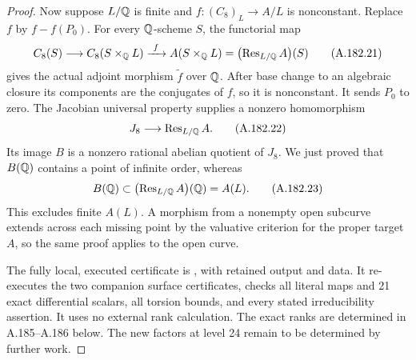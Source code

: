 \begin{proof}
Now suppose \(L/\mathbb Q\) is finite and \(f:(C_8)_L\to A/L\)
is nonconstant.  Replace \(f\) by \(f-f(P_0)\).  For every
\(\mathbb Q\)-scheme \(S\), the functorial map
\[
 C_8(S)\longrightarrow C_8(S\times_{\mathbb Q}L)
       \xrightarrow{\ f\ }A(S\times_{\mathbb Q}L)
       =\bigl(\operatorname{Res}_{L/\mathbb Q}A\bigr)(S)
\tag{A.182.21}
\]
gives the actual adjoint morphism \(\widetilde f\) over
\(\mathbb Q\).  After base change to an algebraic closure its
components are the conjugates of \(f\), so it is nonconstant.
It sends \(P_0\) to zero.  The Jacobian universal property
\cite[III, Proposition 6.1]{LegMilneAV2008} supplies a nonzero
homomorphism
\[
         J_8\longrightarrow\operatorname{Res}_{L/\mathbb Q}A.
\tag{A.182.22}
\]
Its image \(B\) is a nonzero rational abelian quotient of
\(J_8\).  We just proved that \(B(\mathbb Q)\) contains a point
of infinite order, whereas
\[
                   B(\mathbb Q)\subset
              \bigl(\operatorname{Res}_{L/\mathbb Q}A\bigr)(\mathbb Q)=A(L).
\tag{A.182.23}
\]
This excludes finite \(A(L)\).  A morphism from a nonempty
open subcurve extends across each missing point by the
valuative criterion for the proper target \(A\), so the
same proof applies to the open curve.

The fully local, executed certificate is
, with
retained output and data.  It re-executes the two companion
surface certificates, checks all literal maps and 21 exact
differential scalars, all torsion bounds, and every stated
irreducibility assertion.  It uses no external rank calculation.
The exact ranks are determined in A.185--A.186 below. The new
factors at level 24 remain to be determined by further work.
\end{proof}
